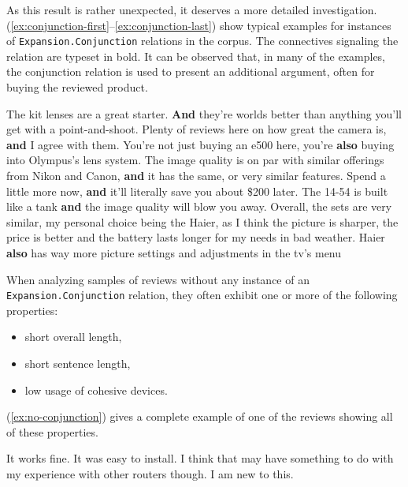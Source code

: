 \documentclass[
    a4paper,%
    12pt,%
    oneside,%
    toc=bibliography,
    final,
]{scrartcl}
\begin{document}
As this result is rather unexpected, it deserves a more detailed investigation. (\ref{ex:conjunction-first}–\ref{ex:conjunction-last}) show typical examples for instances of \lstinline|Expansion.Conjunction| relations in the corpus. The connectives signaling the relation are typeset in bold. It can be observed that, in many of the examples, the conjunction relation is used to present an additional argument, often for buying the reviewed product.

\begin{exe}
\ex \label{ex:conjunction-first} The kit lenses are a great starter. \textbf{And} they're worlds better than anything you'll get with a point-and-shoot.
\ex Plenty of reviews here on how great the camera is, \textbf{and} I agree with them.
\ex You're not just buying an e500 here, you're \textbf{also} buying into Olympus's lens system.
\ex The image quality is on par with similar offerings from Nikon and Canon, \textbf{and} it has the same, or very similar features.
\ex Spend a little more now, \textbf{and} it'll literally save you about \$200 later.
\ex The 14-54 is built like a tank \textbf{and} the image quality will blow you away.
\ex \label{ex:conjunction-last} Overall, the sets are very similar, my personal choice being the Haier, as I think the picture is sharper, the price is better and the battery lasts longer for my needs in bad weather. Haier \textbf{also} has way more picture settings and adjustments in the tv's menu
\end{exe}

When analyzing samples of reviews without any instance of an \lstinline|Expansion.Conjunction| relation, they often exhibit one or more of the following properties:

\begin{itemize}
\item short overall length,
\item short sentence length,
\item low usage of cohesive devices.
\end{itemize}

(\ref{ex:no-conjunction}) gives a complete example of one of the reviews showing all of these properties.

\begin{exe}
\ex \label{ex:no-conjunction} It works fine.  It was easy to install.  I think that may have something to do with my experience with other routers though.  I am new to this.
\end{exe}
\end{document}
